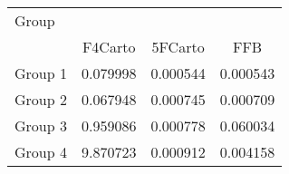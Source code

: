 \begin{tabular}{lccc}
\toprule
Group &  \\
\cmidrule(lr){2-4}
     & F4Carto & 5FCarto & FFB \\
\midrule

Group 1 & 0.079998 & 0.000544 & 0.000543 \\
Group 2 & 0.067948 & 0.000745 & 0.000709 \\
Group 3 & 0.959086 & 0.000778 & 0.060034 \\
Group 4 & 9.870723 & 0.000912 & 0.004158 \\
\bottomrule
\end{tabular}
